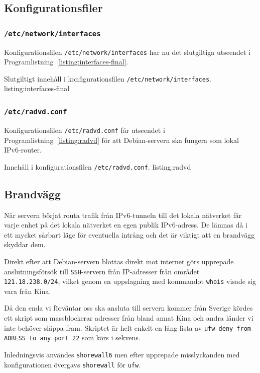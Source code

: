 \subsection{Konfigurationsfiler}
\subsubsection{\texttt{/etc/network/interfaces}}
Konfigurationsfilen \texttt{/etc/network/interfaces} har nu det slutgiltiga
utseendet i Programlistning~\ref{listing:interfaces-final}.

						 {Slutgiltigt innehåll i konfigurationsfilen
					    \texttt{/etc/network/interfaces}.}
             {listing:interfaces-final}


\subsubsection{\texttt{/etc/radvd.conf}}
Konfigurationsfilen \texttt{/etc/radvd.conf} får utseendet i
Programlistning~\ref{listing:radvd} för att Debian-servern ska fungera som
lokal IPv6-router.

						 {Innehåll i konfigurationsfilen \texttt{/etc/radvd.conf}.}
             {listing:radvd}


\subsection{Brandvägg}
När servern börjat routa trafik från IPv6-tunneln till det lokala
nätverket får varje enhet på det lokala nätverket en egen publik IPv6-adress.
De lämnas då i ett mycket sårbart läge för eventuella intrång och det
är viktigt att en brandvägg skyddar dem. 

Direkt efter att Debian-servern blottas direkt mot internet görs upprepade
anslutningsförsök till \texttt{SSH}-servern från IP-adresser från området
\texttt{121.18.238.0/24}, vilket genom en uppslagning med kommandot
\texttt{whois} visade sig vara från Kina.

Då den enda vi förväntar oss ska ansluta till servern kommer från Sverige
kördes ett skript \cite{blockchina} som massblockerar adresser från bland annat
Kina och andra länder vi inte behöver släppa fram. Skriptet är helt enkelt en
lång lista av \texttt{ufw deny from ADRESS to any port 22} som körs i sekvens.

Inledningsvis användes \texttt{shorewall6} men efter upprepade misslyckanden
med konfigurationen övergavs \texttt{shorewall} för \texttt{ufw}.

